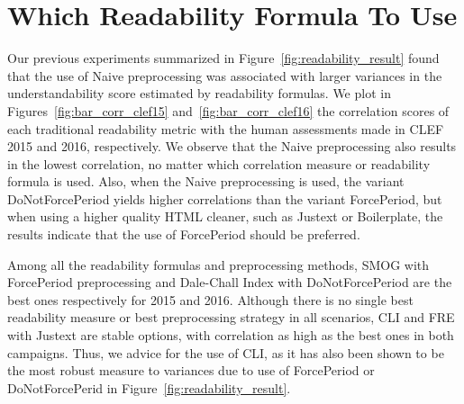 \documentclass[runningheads,a4paper]{llncs}
\begin{document}
\section{Which Readability Formula To Use}
\label{sec:which_readability}


Our previous experiments summarized in Figure~\ref{fig:readability_result} found that the use of Naive preprocessing was associated with larger variances in the understandability score estimated by readability formulas. We plot in Figures~\ref{fig:bar_corr_clef15} and~\ref{fig:bar_corr_clef16} the correlation scores of each traditional readability metric with the human assessments made in CLEF 2015 and 2016, respectively. We observe that the Naive preprocessing also results in the lowest
correlation, no matter which correlation measure or readability formula is used. Also, when the Naive preprocessing is used, the variant DoNotForcePeriod yields higher correlations than the variant ForcePeriod, but when using a higher quality HTML cleaner, such as Justext or Boilerplate, the results indicate that the use of ForcePeriod should be preferred.

Among all the readability formulas and preprocessing methods, SMOG with ForcePeriod preprocessing and Dale-Chall Index with DoNotForcePeriod are the best ones respectively for 2015 and 2016. 
Although there is no single best readability measure or best preprocessing strategy in all scenarios, CLI and FRE with Justext are stable options, with correlation as high as the best ones in both campaigns.
Thus, we advice for the use of CLI, as it has also been shown to be the most robust measure to variances due to use of ForcePeriod or DoNotForcePerid in Figure~\ref{fig:readability_result}.
\end{document}
